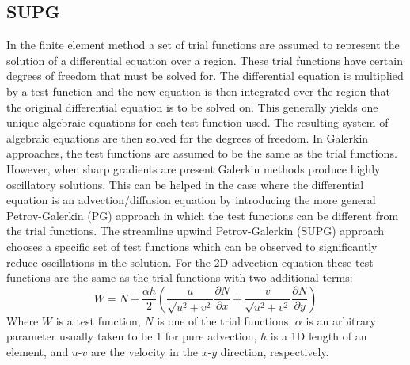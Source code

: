 \subsection{SUPG}
\label{SUPG}
In the finite element method a set of trial functions are assumed to represent the solution of a differential equation over a region. These trial functions have certain degrees of freedom that must be solved for. The differential equation is multiplied by a test function and the new equation is then integrated over the region that the original differential equation is to be solved on. This generally yields one unique algebraic equations for each test function used. The resulting system of algebraic equations are then solved for the degrees of freedom. 
In Galerkin approaches, the test functions are assumed to be the same as the trial functions. However, when sharp gradients are present Galerkin methods produce highly oscillatory solutions. This can be helped in the case where the differential equation is an advection/diffusion equation by introducing the more general Petrov-Galerkin (PG) approach in which the test functions can be different from the trial functions. The streamline upwind Petrov-Galerkin (SUPG) approach chooses a specific set of test functions which can be observed to significantly reduce oscillations in the solution. For the 2D advection equation these test functions are the same as the trial functions with two additional terms:
\begin{equation}
W = N + \frac{\alpha h}{2}\left(\frac{u}{\sqrt{u^2+v^2}}\frac{\partial N}{\partial x} + \frac{v}{\sqrt{u^2+v^2}}\frac{\partial N}{\partial y}\right)
\end{equation}
Where $W$ is a test function, $N$ is one of the trial functions, $\alpha$ is an arbitrary parameter usually taken to be 1 for pure advection, $h$ is a 1D length of an element, and $u$-$v$ are the velocity in the $x$-$y$ direction, respectively.
